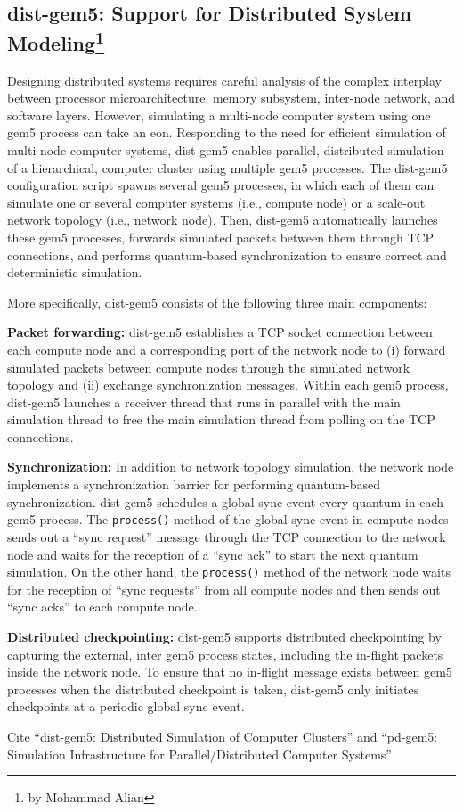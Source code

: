 \subsection[dist-gem5: Support for Distributed System Modeling]{dist-gem5: Support for Distributed System Modeling\footnote{by Mohammad Alian}}
\label{sec:dist-gem5}

Designing distributed systems requires careful analysis of the complex interplay between processor
microarchitecture, memory subsystem, inter-node network, and software layers.
However, simulating a multi-node computer system using one gem5 process can take an eon.
Responding to the need for efficient simulation of multi-node computer systems, dist-gem5 enables parallel, distributed simulation of a hierarchical, computer cluster using multiple gem5 processes.
The dist-gem5 configuration script spawns several gem5 processes, in which each of them can simulate one or several computer systems (i.e., compute node) or a scale-out network topology (i.e., network node).
Then, dist-gem5 automatically launches these gem5 processes, forwards simulated packets between them through TCP connections, and performs quantum-based synchronization to ensure correct and deterministic simulation.

More specifically, dist-gem5 consists of the following three main components:

\textbf{Packet forwarding:} dist-gem5 establishes a TCP socket connection between each compute node and a corresponding port of the network node to (i) forward simulated packets between compute nodes
through the simulated network topology and (ii) exchange synchronization messages.
Within each gem5 process, dist-gem5 launches a receiver thread that runs in parallel with the main simulation thread to free the main simulation thread from polling on the TCP connections.

\textbf{Synchronization:} In addition to network topology simulation, the network node implements a
synchronization barrier for performing quantum-based synchronization.
dist-gem5 schedules a global
sync event every quantum in each gem5 process.
The \verb|process()| method of the global sync event in
compute nodes sends out a ``sync request'' message through the TCP connection to the network node
and waits for the reception of a ``sync ack'' to start the next quantum simulation.
On the other hand, the \verb|process()| method of the network node waits for the reception of ``sync requests'' from all compute nodes and then sends out ``sync acks'' to each compute node.

\textbf{Distributed checkpointing:} dist-gem5 supports distributed checkpointing by capturing the external, inter gem5 process states, including the in-flight packets inside the network node.
To ensure that no in-flight message exists between gem5 processes when the distributed checkpoint is taken, dist-gem5 only initiates checkpoints at a periodic global sync event.

Cite ``dist-gem5: Distributed Simulation of Computer Clusters'' and ``pd-gem5: Simulation Infrastructure for Parallel/Distributed Computer Systems''
